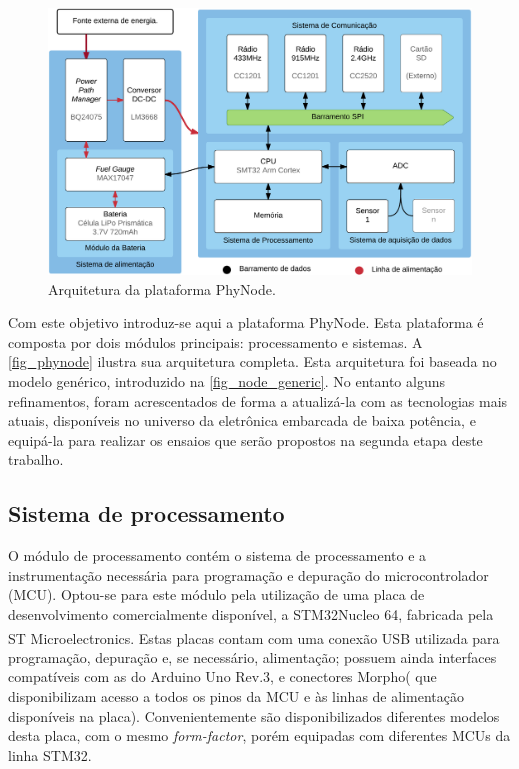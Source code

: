 \documentclass[
	12pt,				%
	openright,			%
	oneside,
	a4paper,			%
	english,			%
	french,				%
	spanish,			%
	brazil				%
	]{abntex2}
\begin{document}
\begin{figure}[htb]
	\caption{\label{fig_phynode}Arquitetura da plataforma PhyNode.}
	\begin{center}
		\includegraphics[width=\linewidth]{SensorNode_PhyNode}
	\end{center}
\end{figure}

Com este objetivo introduz-se aqui a plataforma PhyNode. Esta plataforma é composta por dois módulos principais: processamento e sistemas. A \autoref{fig_phynode} ilustra sua arquitetura completa. Esta arquitetura foi baseada no modelo genérico, introduzido na \autoref{fig_node_generic}. No entanto alguns refinamentos, foram acrescentados de forma a atualizá-la com as tecnologias mais atuais, disponíveis no universo da eletrônica embarcada de baixa potência, e equipá-la para realizar os ensaios que serão propostos na segunda etapa deste trabalho.

\subsection{Sistema de processamento}

O módulo de processamento contém o sistema de processamento e a instrumentação necessária para programação e depuração do microcontrolador (MCU). Optou-se para este módulo pela utilização de uma placa de desenvolvimento comercialmente disponível, a STM32Nucleo 64, fabricada pela ST\textsuperscript{\textregistered} Microelectronics. Estas placas contam com uma conexão USB utilizada para programação, depuração e, se necessário, alimentação; possuem ainda interfaces compatíveis com as do Arduino Uno Rev.3\texttrademark, e conectores Morpho\texttrademark ( que disponibilizam acesso a todos os pinos da MCU e às linhas de alimentação disponíveis na placa). Convenientemente são disponibilizados diferentes modelos desta placa, com o mesmo \textit{form-factor}, porém equipadas com diferentes MCUs da linha STM32\texttrademark.
\end{document}
